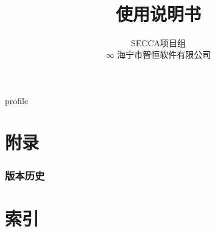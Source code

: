 \documentclass[hyperref, oneside]{book}
\title {\modtitle \\ \modsubtitle \\ 使用说明书}
\author{SECCA项目组 \\ $\infty$ \small{海宁市智恒软件有限公司}}
\begin{document}
\maketitle

\renewcommand\contentsname{目录/Contents}
\tableofcontents
\clearpage

\def\DIRNAME{.}
{profile}

\chapter{附录}

    \clearpage
    \subsection{版本历史}
        \begin{center}
        \centering
        \end{center}

\chapter{索引}

    \listoftables
    \listoffigures
\end{document}
